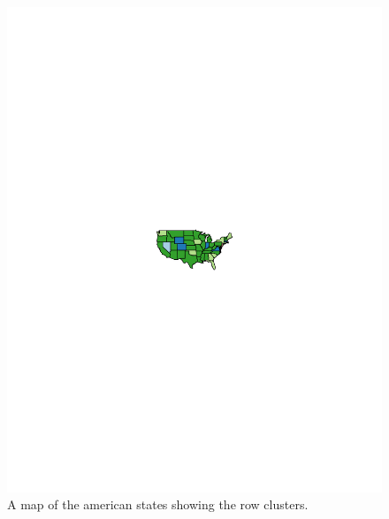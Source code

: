 \documentclass[12pt,a4paper]{article}
\begin{document}
\begin{figure}[H]
	\begin{center}
		\includegraphics[width=\columnwidth]{Deaths_map.pdf}
		\caption{A map of the american states showing the row clusters.}
		
	\end{center}
\end{figure}
\end{document}
